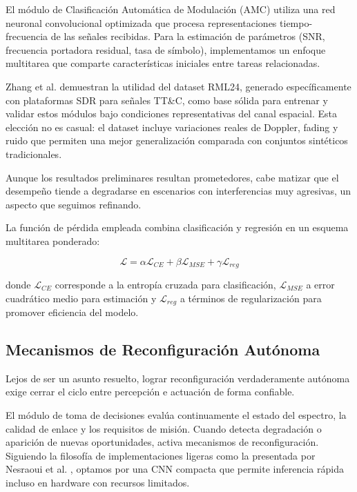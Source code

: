 El módulo de Clasificación Automática de Modulación (AMC) utiliza una red neuronal convolucional optimizada que procesa representaciones tiempo-frecuencia de las señales recibidas. Para la estimación de parámetros (SNR, frecuencia portadora residual, tasa de símbolo), implementamos un enfoque multitarea que comparte características iniciales entre tareas relacionadas. 

Zhang et al. \cite{Zhang2026} demuestran la utilidad del dataset RML24, generado específicamente con plataformas SDR para señales TT\&C, como base sólida para entrenar y validar estos módulos bajo condiciones representativas del canal espacial. Esta elección no es casual: el dataset incluye variaciones reales de Doppler, fading y ruido que permiten una mejor generalización comparada con conjuntos sintéticos tradicionales.

Aunque los resultados preliminares resultan prometedores, cabe matizar que el desempeño tiende a degradarse en escenarios con interferencias muy agresivas, un aspecto que seguimos refinando.

La función de pérdida empleada combina clasificación y regresión en un esquema multitarea ponderado:

\begin{equation}
\mathcal{L} = \alpha \mathcal{L}_{CE} + \beta \mathcal{L}_{MSE} + \gamma \mathcal{L}_{reg}
\label{eq:loss_function}
\end{equation}

donde \(\mathcal{L}_{CE}\) corresponde a la entropía cruzada para clasificación, \(\mathcal{L}_{MSE}\) a error cuadrático medio para estimación y \(\mathcal{L}_{reg}\) a términos de regularización para promover eficiencia del modelo.

\subsection{Mecanismos de Reconfiguración Autónoma}

Lejos de ser un asunto resuelto, lograr reconfiguración verdaderamente autónoma exige cerrar el ciclo entre percepción e actuación de forma confiable. 

El módulo de toma de decisiones evalúa continuamente el estado del espectro, la calidad de enlace y los requisitos de misión. Cuando detecta degradación o aparición de nuevas oportunidades, activa mecanismos de reconfiguración. Siguiendo la filosofía de implementaciones ligeras como la presentada por Nesraoui et al. \cite{Nesraoui2024}, optamos por una CNN compacta que permite inferencia rápida incluso en hardware con recursos limitados.

